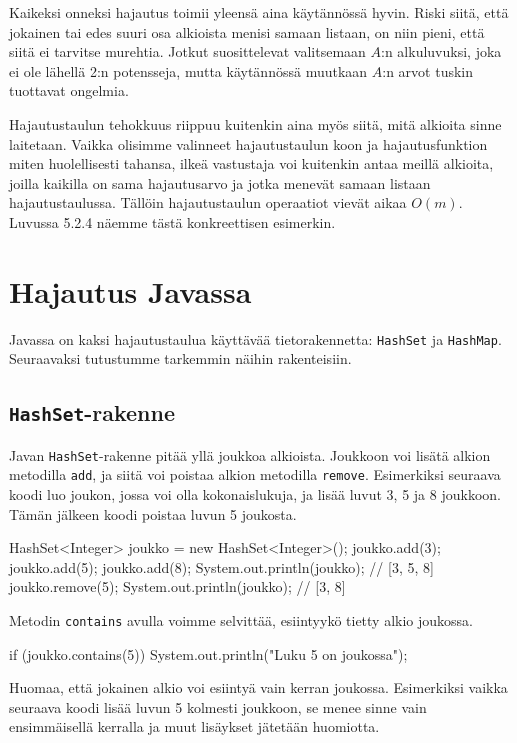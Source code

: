 Kaikeksi onneksi hajautus toimii yleensä aina käytännössä hyvin.
Riski siitä, että jokainen tai edes suuri osa alkioista
menisi samaan listaan, on niin pieni,
että siitä ei tarvitse murehtia.
Jotkut suosittelevat valitsemaan $A$:n alkuluvuksi,
joka ei ole lähellä 2:n potensseja,
mutta käytännössä muutkaan $A$:n arvot tuskin
tuottavat ongelmia.

Hajautustaulun tehokkuus riippuu kuitenkin aina myös siitä,
mitä alkioita sinne laitetaan.
Vaikka olisimme valinneet hajautustaulun koon ja
hajautusfunktion miten huolellisesti tahansa,
ilkeä vastustaja voi kuitenkin antaa meillä alkioita,
joilla kaikilla on sama hajautusarvo ja jotka
menevät samaan listaan hajautustaulussa.
Tällöin hajautustaulun operaatiot vievät aikaa $O(m)$.
Luvussa 5.2.4 näemme tästä konkreettisen esimerkin.

\section{Hajautus Javassa}

Javassa on kaksi hajautustaulua käyttävää tietorakennetta:
\texttt{HashSet} ja \texttt{HashMap}.
Seuraavaksi tutustumme tarkemmin näihin rakenteisiin.

\subsection{\texttt{HashSet}-rakenne}

Javan \texttt{HashSet}-rakenne pitää yllä joukkoa alkioista.
Joukkoon voi lisätä alkion metodilla \texttt{add},
ja siitä voi poistaa alkion metodilla \texttt{remove}.
Esimerkiksi seuraava koodi luo joukon, jossa voi olla
kokonaislukuja, ja lisää luvut 3, 5 ja 8 joukkoon.
Tämän jälkeen koodi poistaa luvun 5 joukosta.

\begin{code}
HashSet<Integer> joukko = new HashSet<Integer>();
joukko.add(3);
joukko.add(5);
joukko.add(8);
System.out.println(joukko); // [3, 5, 8]
joukko.remove(5);
System.out.println(joukko); // [3, 8]
\end{code}

Metodin \texttt{contains} avulla voimme selvittää,
esiintyykö tietty alkio joukossa.

\begin{code}
if (joukko.contains(5)) {
    System.out.println("Luku 5 on joukossa");
}
\end{code}

Huomaa, että jokainen alkio voi esiintyä vain kerran joukossa.
Esimerkiksi vaikka seuraava koodi lisää luvun 5 kolmesti
joukkoon, se menee sinne vain ensimmäisellä kerralla ja
muut lisäykset jätetään huomiotta.

